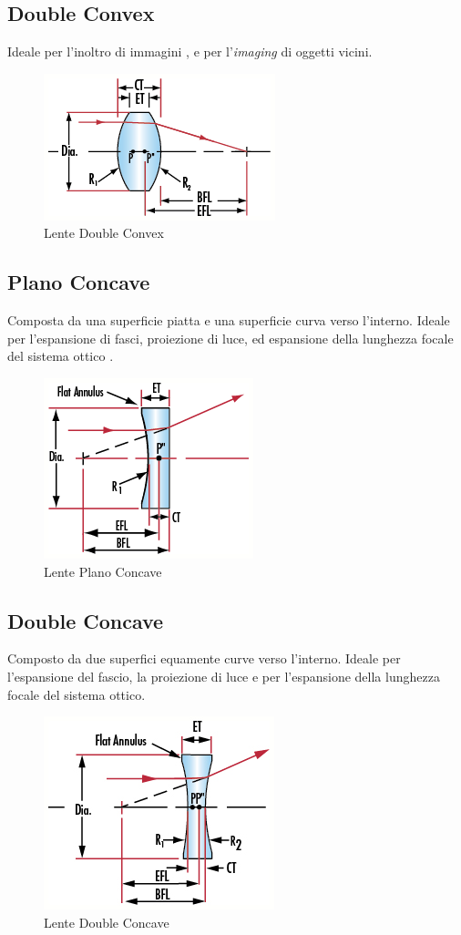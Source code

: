 \subsection{Double Convex}
Ideale per l'inoltro di immagini , e per l'\emph{imaging} di oggetti vicini.
\begin{figure}[!ht]
\centering

\includegraphics[width=.3\textwidth]{img/double-convex.png}

\caption{Lente Double Convex}
\label{fig:ccd-blockdiagram}
\end{figure}

\subsection{Plano Concave}
Composta da una superficie piatta e una superficie curva verso l'interno. Ideale per l'espansione di fasci, proiezione di luce, ed espansione della lunghezza focale del sistema ottico .

\begin{figure}[!ht]
\centering

\includegraphics[width=.3\textwidth]{img/plano-concave.png}

\caption{Lente Plano Concave}
\label{fig:ccd-blockdiagram}
\end{figure}


\subsection{Double Concave}
Composto da due superfici equamente curve  verso l'interno. Ideale per l'espansione del fascio, la proiezione di luce e per l'espansione della lunghezza focale del sistema ottico.
\begin{figure}[!ht]
\centering

\includegraphics[width=.3\textwidth]{img/double-concave.png}

\caption{Lente Double Concave}
\label{fig:ccd-blockdiagram}
\end{figure}

